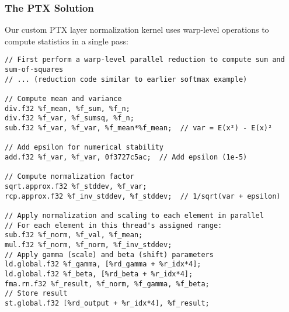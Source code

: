 \subsubsection{The PTX Solution}

Our custom PTX layer normalization kernel uses warp-level operations to compute statistics in a single pass:

\begin{lstlisting}[style=ptx]
// First perform a warp-level parallel reduction to compute sum and sum-of-squares
// ... (reduction code similar to earlier softmax example)

// Compute mean and variance
div.f32 %f_mean, %f_sum, %f_n;
div.f32 %f_var, %f_sumsq, %f_n;
sub.f32 %f_var, %f_var, %f_mean*%f_mean;  // var = E(x²) - E(x)²

// Add epsilon for numerical stability
add.f32 %f_var, %f_var, 0f3727c5ac;  // Add epsilon (1e-5)

// Compute normalization factor
sqrt.approx.f32 %f_stddev, %f_var;
rcp.approx.f32 %f_inv_stddev, %f_stddev;  // 1/sqrt(var + epsilon)

// Apply normalization and scaling to each element in parallel
// For each element in this thread's assigned range:
sub.f32 %f_norm, %f_val, %f_mean;
mul.f32 %f_norm, %f_norm, %f_inv_stddev;
// Apply gamma (scale) and beta (shift) parameters
ld.global.f32 %f_gamma, [%rd_gamma + %r_idx*4];
ld.global.f32 %f_beta, [%rd_beta + %r_idx*4];
fma.rn.f32 %f_result, %f_norm, %f_gamma, %f_beta;
// Store result
st.global.f32 [%rd_output + %r_idx*4], %f_result;
\end{lstlisting}

